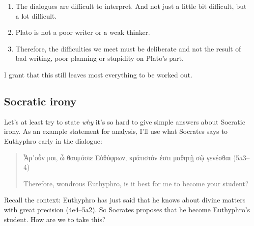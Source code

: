 \documentclass[11pt]{article}
\begin{document}
\begin{enumerate}
    \item The dialogues are difficult to interpret.  And not just a little bit difficult, but a lot difficult.
    \item Plato is not a poor writer or a weak thinker.
    \item Therefore, the difficulties we meet must be deliberate and not the result of bad writing, poor planning or stupidity on Plato's part.
\end{enumerate}

I grant that this still leaves most everything to be worked out.

\subsection{Socratic irony}

Let's at least try to state \emph{why} it's so hard to give simple answers about Socratic irony.  As an example statement for analysis, I'll use what Socrates says to Euthyphro early in the dialogue:

\begin{quote}
    Ἆρ᾽οὖν μοι, ὦ θαυμάσιε Εὐθύφρων, κράτιστόν ἐστι μαθητῇ σῷ γενέσθαι (5a3--4)

    Therefore, wondrous Euthyphro, is it best for me to become your student?
\end{quote}

Recall the context: Euthyphro has just said that he knows about divine matters with great precision (4e4--5a2).  So Socrates proposes that he become Euthyphro's student.  How are we to take this?
\end{document}
